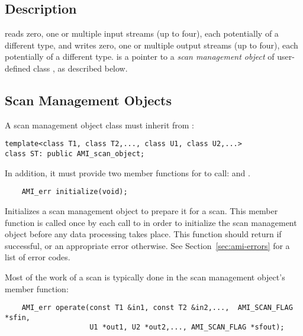 \subsection{Description}

 reads zero, one or multiple input streams (up to
four), each potentially of a different type, and writes zero, one or
multiple output streams (up to four), each potentially of a different type.
 is a pointer to a {\em scan management object} of user-defined
class , as described below.  

\subsection{Scan Management Objects}


A scan management object class must inherit from :
\begin{verbatim}
template<class T1, class T2,..., class U1, class U2,...>
class ST: public AMI_scan_object;
\end{verbatim}
In addition, it must provide two member
functions for  to call:  and .
\begin{verbatim}
    AMI_err initialize(void);
\end{verbatim}
    Initializes a scan management object to prepare
    it for a scan.  This member function is called once by
    each call to  in order to initialize
    the scan management object before any data processing
    takes place.  This function should return
     if successful, or an
    appropriate error otherwise. See
    Section~\ref{sec:ami-errors} for a list of error codes.
    
    Most of the work of a scan is typically done in the scan
    management object's  member function:
\begin{verbatim}
    AMI_err operate(const T1 &in1, const T2 &in2,...,  AMI_SCAN_FLAG *sfin,
                    U1 *out1, U2 *out2,..., AMI_SCAN_FLAG *sfout);
\end{verbatim}
    
